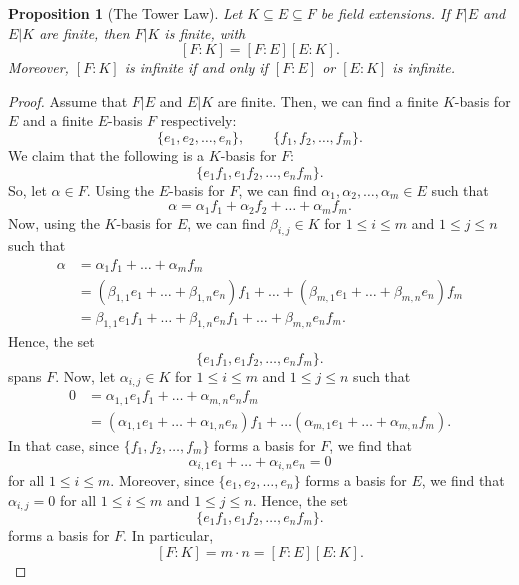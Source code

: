 \documentclass[a4paper, openany]{memoir}
\theoremstyle{definition}
\theoremstyle{plain}
\newtheorem{proposition}[definition]{Proposition}
\begin{document}
    \begin{proposition}[The Tower Law]
        Let $K \subseteq E \subseteq F$ be field extensions. If $F|E$ and $E|K$ are finite, then $F|K$ is finite, with
        \[[F : K] = [F : E][E : K].\]
        Moreover, $[F : K]$ is infinite if and only if $[F : E]$ or $[E : K]$ is infinite.
    \end{proposition}
    \begin{proof}
        Assume that $F|E$ and $E|K$ are finite. Then, we can find a finite $K$-basis for $E$ and a finite $E$-basis $F$ respectively:
        \[\{e_1, e_2, \dots, e_n\}, \qquad \{f_1, f_2, \dots, f_m\}.\]
        We claim that the following is a $K$-basis for $F$:
        \[\{e_1f_1, e_1f_2, \dots, e_nf_m\}.\]
        So, let $\alpha \in F$. Using the $E$-basis for $F$, we can find $\alpha_1, \alpha_2, \dots, \alpha_m \in E$ such that
        \[\alpha = \alpha_1 f_1 + \alpha_2 f_2 + \dots + \alpha_m f_m.\]
        Now, using the $K$-basis for $E$, we can find $\beta_{i, j} \in K$ for $1 \leq i \leq m$ and $1 \leq j \leq n$ such that
        \begin{align*}
            \alpha &= \alpha_1 f_1 + \dots + \alpha_m f_m \\
            &= (\beta_{1, 1} e_1 + \dots + \beta_{1, n} e_n) f_1 + \dots + (\beta_{m, 1} e_1 + \dots + \beta_{m, n} e_n) f_m \\
            &= \beta_{1, 1} e_1f_1 + \dots + \beta_{1, n} e_nf_1 + \dots + \beta_{m, n} e_nf_m.
        \end{align*}
        Hence, the set 
        \[\{e_1f_1, e_1f_2, \dots, e_nf_m\}.\]
        spans $F$. Now, let $\alpha_{i, j} \in K$ for $1 \leq i \leq m$ and $1 \leq j \leq n$ such that
        \begin{align*}
            0 &= \alpha_{1, 1} e_1 f_1 + \dots + \alpha_{m, n} e_n f_m \\
            &= (\alpha_{1, 1} e_1 + \dots + \alpha_{1, n} e_n) f_1 + \dots (\alpha_{m, 1} e_1 + \dots + \alpha_{m, n} f_m).
        \end{align*}
        In that case, since $\{f_1, f_2, \dots, f_m\}$ forms a basis for $F$, we find that 
        \[\alpha_{i, 1} e_1 + \dots + \alpha_{i, n} e_n = 0\]
        for all $1 \leq i \leq m$. Moreover, since $\{e_1, e_2, \dots, e_n\}$ forms a basis for $E$, we find that $\alpha_{i, j} = 0$ for all $1 \leq i \leq m$ and $1 \leq j \leq n$. Hence, the set 
        \[\{e_1f_1, e_1f_2, \dots, e_nf_m\}.\]
        forms a basis for $F$. In particular, 
        \[[F : K] = m \cdot n = [F : E][E : K].\]
    \end{proof}
\end{document}
